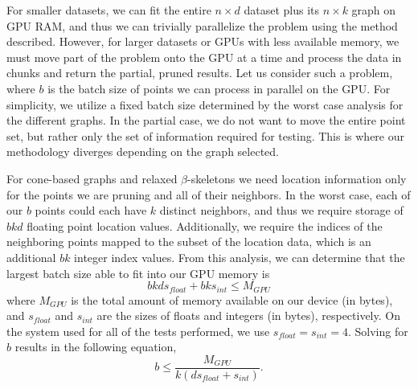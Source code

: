 For smaller datasets, we can fit the entire $n \times d$ dataset plus its $n \times k$ graph on GPU RAM, and thus we can trivially parallelize the problem using the method described.
%
However, for larger datasets or GPUs with less available memory, we must move part of the problem onto the GPU at a time and process the data in chunks and return the partial, pruned results.
%
Let us consider such a problem, where $b$ is the batch size of points we can process in parallel on the GPU.
%
For simplicity, we utilize a fixed batch size determined by the worst case analysis for the different graphs.
%
In the partial case, we do not want to move the entire point set, but rather only the set of information required for testing.
%
This is where our methodology diverges depending on the graph selected.

For cone-based graphs and relaxed $\beta$-skeletons we need location information only for the points we are pruning and all of their neighbors.
%
In the worst case, each of our $b$ points could each have $k$ distinct neighbors, and thus we require storage of $bkd$ floating point location values.
%
Additionally, we require the indices of the neighboring points mapped to the subset of the location data, which is an additional $bk$ integer index values.
%
From this analysis, we can determine that the largest batch size able to fit into our GPU memory is
%
\begin{equation}
    bkds_{float} + bks_{int} \leq M_{GPU}
\end{equation}
%
where $M_{GPU}$ is the total amount of memory available on our device (in bytes), and $s_{float}$ and $s_{int}$ are the sizes of floats and integers (in bytes), respectively.
%
On the system used for all of the tests performed, we use $s_{float} = s_{int} = 4$.
%
Solving for $b$ results in the following equation,
%
\begin{equation}
    b \leq \frac{M_{GPU}}{k(ds_{float} + s_{int})}.
\end{equation}

